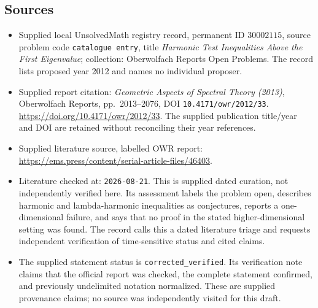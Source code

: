 \documentclass[11pt]{article}
\begin{document}
\subsection{Sources}
\begin{itemize}
\item Supplied local UnsolvedMath registry record, permanent ID \(30002115\), source problem code \texttt{catalogue entry}, title \emph{Harmonic Test Inequalities Above the First Eigenvalue}; collection: Oberwolfach Reports Open Problems. The record lists proposed year 2012 and names no individual proposer.
\item Supplied report citation: \emph{Geometric Aspects of Spectral Theory (2013)}, Oberwolfach Reports, pp.\ 2013--2076, DOI \texttt{10.4171/owr/2012/33}. \url{https://doi.org/10.4171/owr/2012/33}. The supplied publication title/year and DOI are retained without reconciling their year references.
\item Supplied literature source, labelled OWR report: \url{https://ems.press/content/serial-article-files/46403}.
\item Literature checked at: \texttt{2026-08-21}. This is supplied dated curation, not independently verified here. Its assessment labels the problem open, describes harmonic and lambda-harmonic inequalities as conjectures, reports a one-dimensional failure, and says that no proof in the stated higher-dimensional setting was found. The record calls this a dated literature triage and requests independent verification of time-sensitive status and cited claims.
\item The supplied statement status is \texttt{corrected\_verified}. Its verification note claims that the official report was checked, the complete statement confirmed, and previously undelimited notation normalized. These are supplied provenance claims; no source was independently visited for this draft.
\end{itemize}
\end{document}
